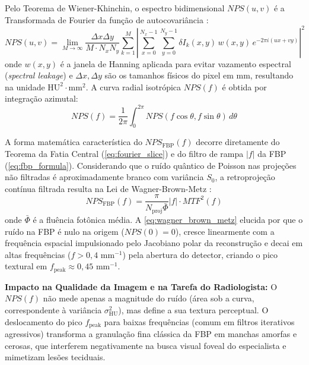 \documentclass[
  12pt,
  a4paper,
  oneside
]{report}
\begin{document}
Pelo Teorema de Wiener-Khinchin, o espectro bidimensional $NPS(u, v)$ é a Transformada de Fourier da função de autocovariância \cite{aapm_tg233_2019}:
\begin{equation}
  NPS(u, v) = \lim_{M \to \infty} \frac{\Delta x \Delta y}{M \cdot N_x N_y} \sum_{k=1}^M \left| \sum_{x=0}^{N_x-1} \sum_{y=0}^{N_y-1} \delta I_k(x, y) \, w(x, y) \, e^{-2\pi i (ux + vy)} \right|^2
  \label{eq:nps_2d_formula}
\end{equation}
onde $w(x, y)$ é a janela de Hanning aplicada para evitar vazamento espectral (\emph{spectral leakage}) e $\Delta x, \Delta y$ são os tamanhos físicos do pixel em mm, resultando na unidade $\text{HU}^2 \cdot \text{mm}^2$. A curva radial isotrópica $NPS(f)$ é obtida por integração azimutal:
\begin{equation}
  NPS(f) = \frac{1}{2\pi} \int_0^{2\pi} NPS(f\cos\theta, f\sin\theta) \, d\theta
  \label{eq:nps_radial_integral}
\end{equation}

A forma matemática característica do $NPS_{\text{FBP}}(f)$ decorre diretamente do Teorema da Fatia Central (\cref{eq:fourier_slice}) e do filtro de rampa $|f|$ da FBP (\cref{eq:fbp_formula}). Considerando que o ruído quântico de Poisson nas projeções não filtradas é aproximadamente branco com variância $S_0$, a retroprojeção contínua filtrada resulta na Lei de Wagner-Brown-Metz \cite{wagner1979, barrett_myers_2004}:
\begin{equation}
  NPS_{\text{FBP}}(f) = \frac{\pi}{N_{\text{proj}} \bar{\Phi}} |f| \cdot MTF^2(f)
  \label{eq:wagner_brown_metz}
\end{equation}
onde $\bar{\Phi}$ é a fluência fotônica média. A \cref{eq:wagner_brown_metz} elucida por que o ruído na FBP é nulo na origem ($NPS(0)=0$), cresce linearmente com a frequência espacial impulsionado pelo Jacobiano polar da reconstrução e decai em altas frequências ($f > 0{,}4\text{ mm}^{-1}$) pela abertura do detector, criando o pico textural em $f_{\text{peak}} \approx 0{,}45\text{ mm}^{-1}$.

\textbf{Impacto na Qualidade da Imagem e na Tarefa do Radiologista:} O $NPS(f)$ não mede apenas a magnitude do ruído (área sob a curva, correspondente à variância $\sigma_{\text{HU}}^2$), mas define a sua textura perceptual. O deslocamento do pico $f_{\text{peak}}$ para baixas frequências (comum em filtros iterativos agressivos) transforma a granulação fina clássica da FBP em manchas amorfas e cerosas, que interferem negativamente na busca visual foveal do especialista e mimetizam lesões teciduais.
\end{document}
